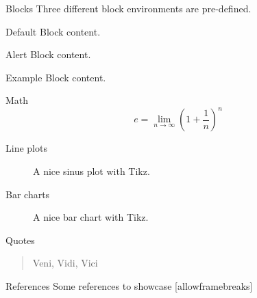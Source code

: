 		
		\begin{frame}{Blocks}
			Three different block environments are pre-defined.
			
			\begin{block}{Default}
			  Block content.
			\end{block}
			
			\begin{alertblock}{Alert}
			  Block content.
			\end{alertblock}
			
			\begin{exampleblock}{Example}
			  Block content.
			\end{exampleblock}
		\end{frame}
		
		\begin{frame}{Math}
			\begin{equation}
				e = \lim_{n\to \infty} \left(1 + \frac{1}{n}\right)^n
			\end{equation}
		\end{frame}
		
		\begin{frame}{Line plots}
			\begin{figure}
				\centering
				\caption{A nice sinus plot with Tikz.}
			\end{figure}
		\end{frame}
		
		\begin{frame}{Bar charts}
			\begin{figure}
				\centering
				\caption{A nice bar chart with Tikz.}
			\end{figure}
		\end{frame}
		
		\begin{frame}{Quotes}
			\begin{quote}
			Veni, Vidi, Vici
			\end{quote}
		\end{frame}
			
		\begin{frame}{References}
			Some references to showcase [allowframebreaks] \cite{knuth92,ConcreteMath,Simpson,Er01,greenwade93}
		\end{frame}
	